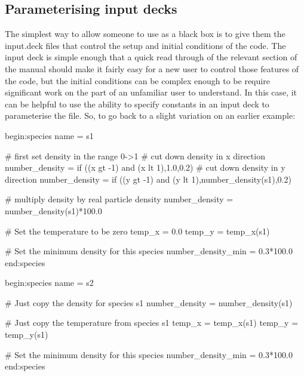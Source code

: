 \subsection{Parameterising input decks}
\label{sec:customising}
The simplest way to allow someone to use {\EPOCH} as a black box is to give them
the input.deck files that control the setup and initial conditions
of the code. The input deck is simple enough that a quick read through of the
relevant section of the manual should make it fairly easy for a new user to
control those features of the code, but the initial conditions can be complex
enough to be require significant work on the part of an unfamiliar user to
understand. In this case, it can be helpful to use the ability to specify
constants in an input deck to parameterise the file. So, to go back to a slight
variation on an earlier example:
\begin{boxverbatim}
begin:species
   name = s1

   # first set density in the range 0->1
   # cut down density in x direction
   number_density = if ((x gt -1) and (x lt 1),1.0,0.2)
   # cut down density in y direction
   number_density = if ((y gt -1) and (y lt 1),number_density(s1),0.2)

   # multiply density by real particle density
   number_density = number_density(s1)*100.0

   # Set the temperature to be zero
   temp_x = 0.0
   temp_y = temp_x(s1)

   # Set the minimum density for this species
   number_density_min = 0.3*100.0
end:species

begin:species
   name = s2

   # Just copy the density for species s1
   number_density = number_density(s1)

   # Just copy the temperature from species s1
   temp_x = temp_x(s1)
   temp_y = temp_y(s1)

   # Set the minimum density for this species
   number_density_min = 0.3*100.0
end:species
\end{boxverbatim}

